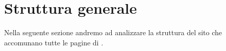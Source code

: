 \section{Struttura generale}
Nella seguente sezione andremo ad analizzare la struttura del sito che accomunano tutte le pagine di \nomeSito. 





%
